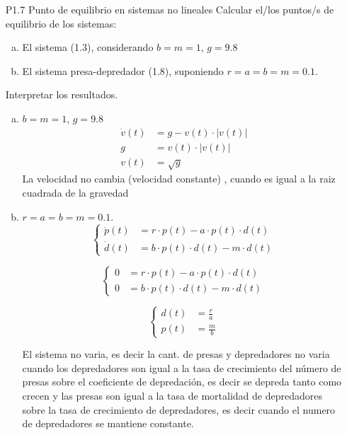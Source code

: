 \documentclass{article}
\begin{document}
\begin{itemize}
   \item[P1.7] Punto de equilibrio en sistemas no lineales Calcular el/los puntos/s de equilibrio de los sistemas:
        \begin{enumerate}[a)]
        \item El sistema (1.3), considerando $b=m=1$, $g=9.8$
        \item El sistema presa-depredador (1.8), suponiendo $r=a=b=m=0.1$. 
        \end{enumerate}
Interpretar los resultados.

        \begin{enumerate}[a)]
        \item $b=m=1$, $g=9.8$
\begin{equation*}
\begin{array}{rl}
\dot{v}(t) &= g - v(t) \cdot  \lvert v(t)\rvert \\
g &= v(t) \cdot  \lvert v(t)\rvert \\
v(t) &= \sqrt{g}
\end{array}
\end{equation*}
La velocidad no cambia (velocidad constante) , cuando es igual a la raiz cuadrada de la gravedad

        \item $r=a=b=m=0.1$. 
\begin{equation*}
\left\{ \begin{array}{rl}
  \dot{p}(t) &= r \cdot p(t) - a \cdot p(t) \cdot d(t) \\
  \dot{d}(t) &= b \cdot p(t) \cdot d(t) - m \cdot d(t)
       \end{array} \right .
\end{equation*}

\begin{equation*}
\left\{ \begin{array}{rl}
  0 &= r \cdot p(t) - a \cdot p(t) \cdot d(t) \\
  0 &= b \cdot p(t) \cdot d(t) - m \cdot d(t)
       \end{array} \right .
\end{equation*}

\begin{equation*}
\left\{ \begin{array}{rl}
  d(t) &= \frac{r}{a} \\
  p(t) &= \frac{m}{b}  
       \end{array} \right .
\end{equation*}


El sistema no varia, es decir la cant. de presas y depredadores no varia cuando los depredadores son igual a la tasa de crecimiento del número de presas sobre el coeficiente de depredación, es decir se depreda tanto como crecen y las presas son igual a la tasa de mortalidad de depredadores sobre la tasa de crecimiento de depredadores, es decir cuando el numero de depredadores se mantiene constante.
        \end{enumerate}


\end{itemize}
\end{document}
